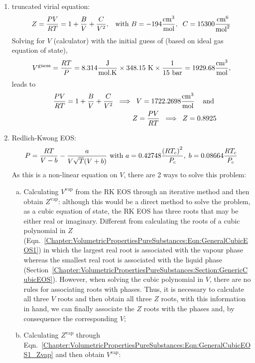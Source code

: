 \begin{probsol}
     \begin{enumerate}[1.]
%
        \item truncated virial equation:
            \begin{displaymath}
               Z =  \displaystyle\frac{PV}{RT}=1+\displaystyle\frac{B}{V}+\displaystyle\frac{C}{V^{2}}, \;\;\;\text{with } B=-194\displaystyle\frac{\text{cm}^{3}}{\text{mol}},\;\;C=15300 \displaystyle\frac{\text{cm}^{6}}{\text{mol}^{2}}
            \end{displaymath}
            Solving for $V$ (calculator) with the initial guess of (based on ideal gas equation of state),
            \begin{displaymath}
               V^{\text{guess}} = \displaystyle\frac{RT}{P} = 8.314 \displaystyle\frac{\text{J}}{\text{mol.K}} \times 348.15\text{ K} \times \displaystyle\frac{1}{15\text{ bar}} = 1929.68 \displaystyle\frac{\text{cm}^{3}}{\text{mol}},
            \end{displaymath}
            leads to
            \begin{eqnarray}
               &&\displaystyle\frac{PV}{RT}=1+\displaystyle\frac{B}{V}+\displaystyle\frac{C}{V^{2}} \;\;\Longrightarrow \;\; V = 1722.2698 \displaystyle\frac{\text{cm}^{3}}{\text{mol}}\;\;\;\text{ and } \nonumber \\
               && Z =  \displaystyle\frac{PV}{RT} \;\;\Longrightarrow \;\; Z = 0.8925 \nonumber
            \end{eqnarray}
%
        \item Redlich-Kwong EOS:
            \begin{displaymath}
               P = \displaystyle\frac{RT}{V-b} - \displaystyle\frac{a}{V\sqrt{T}(V+b)}\text{ with } a = 0.42748\displaystyle\frac{\left(R T_{c}\right)^{2}}{P_{c}},\; b = 0.08664\displaystyle\frac{R T_{c}}{P_{c}}
            \end{displaymath}
            As this is a non-linear equation on $V$, there are 2 ways to solve this problem:
            \begin{enumerate}[a)]
               \item Calculating $V^{\text{vap}}$ from the RK EOS through an iterative method and then obtain $Z^{\text{vap}}$: although this would be a direct method to solve the problem, as a cubic equation of state, the RK EOS has three roots that may be either real or imaginary. Different from calculating the roots of a cubic polynomial in $Z$ (Eqn.~\ref{Chapter:VolumetricPropertiesPureSubstances:Eqn:GeneralCubicEOS1}) in which the largest real root is associated with the vapour phase whereas the smallest real root is associated with the liquid phase (Section~\ref{Chapter:VolumetricPropertiesPureSubstances:Section:GenericCubicEOS}). However, when solving the cubic polynomial in $V$, there are no rules for associating roots with phases. Thus, it is necessary to calculate all three $V$ roots and then obtain all three $Z$ roots, with this information in hand, we can finally associate the $Z$ roots with the phases and, by consequence the corresponding $V$;
               \item Calculating $Z^{\text{vap}}$ through Eqn.~\ref{Chapter:VolumetricPropertiesPureSubstances:Eqn:GeneralCubicEOS1_Zvap} and then obtain $V^{\text{vap}}$:
            \end{enumerate}
%
     \end{enumerate}


  \end{probsol}
